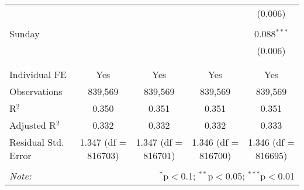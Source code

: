\documentclass[
]{article}
\begin{document}
\begin{table}[!htbp]
{\begin{tabular}{@{\extracolsep{5pt}}lcccc}
  &  &  &  & (0.006) \\ 
  & & & & \\ 
 Sunday &  &  &  & 0.088$^{***}$ \\ 
  &  &  &  & (0.006) \\ 
  & & & & \\ 
\hline \\[-1.8ex] 
Individual FE & Yes & Yes & Yes & Yes \\ 
Observations & 839,569 & 839,569 & 839,569 & 839,569 \\ 
R$^{2}$ & 0.350 & 0.351 & 0.351 & 0.351 \\ 
Adjusted R$^{2}$ & 0.332 & 0.332 & 0.332 & 0.333 \\ 
Residual Std. Error & 1.347 (df = 816703) & 1.347 (df = 816701) & 1.346 (df = 816700) & 1.346 (df = 816695) \\ 
\hline 
\hline \\[-1.8ex] 
\textit{Note:}  & \multicolumn{4}{r}{$^{*}$p$<$0.1; $^{**}$p$<$0.05; $^{***}$p$<$0.01} \\ 
\end{tabular}
} 
\end{table} 
\newpage
\end{document}
